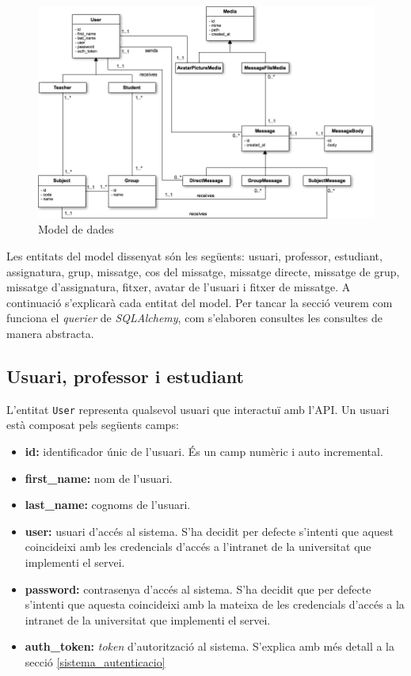 \begin{figure}[here]
    \includegraphics[scale=0.5]{img/uml.png}
    \centering
    \caption{Model de dades}
    \label{fig:model}
\end{figure}

Les entitats del model dissenyat són les següents: usuari, professor, estudiant, assignatura, grup, missatge, cos del missatge, missatge directe, missatge de grup, missatge d'assignatura, fitxer, avatar de l'usuari i fitxer de missatge. A continuació s'explicarà cada entitat del model. Per tancar la secció veurem com funciona el \emph{querier} de \emph{SQLAlchemy}, com s'elaboren consultes les consultes de manera abstracta.

	\subsection{Usuari, professor i estudiant} \label{usuari_professor_estudiant}

	L'entitat \texttt{User} representa qualsevol usuari que interactuï amb l'\ac{API}. Un usuari està composat pels següents camps: 
	
	\begin{itemize}
		\item \textbf{id:} identificador únic de l'usuari. És un camp numèric i auto incremental.
		\item \textbf{first\_name:} nom de l'usuari.
		\item \textbf{last\_name:} cognoms de l'usuari.
		\item \textbf{user:} usuari d'accés al sistema. S'ha decidit per defecte s'intenti que aquest coincideixi amb les credencials d'accés a l'intranet de la universitat que implementi el servei.
		\item \textbf{password:} contrasenya d'accés al sistema. S'ha decidit que per defecte s'intenti que aquesta coincideixi amb la mateixa de les credencials d'accés a la intranet de la universitat que implementi el servei. 
		\item \textbf{auth\_token:} \emph{token} d'autorització al sistema. S'explica amb més detall a la secció \ref{sistema_autenticacio}
	\end{itemize}
	
